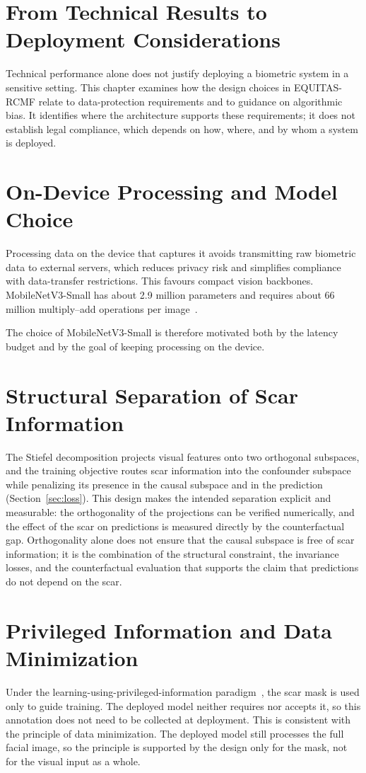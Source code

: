 \section{From Technical Results to Deployment Considerations}
Technical performance alone does not justify deploying a biometric system in a sensitive setting. This chapter examines how the design choices in EQUITAS-RCMF relate to data-protection requirements and to guidance on algorithmic bias. It identifies where the architecture supports these requirements; it does not establish legal compliance, which depends on how, where, and by whom a system is deployed.

\section{On-Device Processing and Model Choice}
Processing data on the device that captures it avoids transmitting raw biometric data to external servers, which reduces privacy risk and simplifies compliance with data-transfer restrictions. This favours compact vision backbones. MobileNetV3-Small has about 2.9 million parameters and requires about 66 million multiply--add operations per image~\cite{howard2019}.

The choice of MobileNetV3-Small is therefore motivated both by the latency budget and by the goal of keeping processing on the device.

\section{Structural Separation of Scar Information}
The Stiefel decomposition projects visual features onto two orthogonal subspaces, and the training objective routes scar information into the confounder subspace while penalizing its presence in the causal subspace and in the prediction (Section~\ref{sec:loss}). This design makes the intended separation explicit and measurable: the orthogonality of the projections can be verified numerically, and the effect of the scar on predictions is measured directly by the counterfactual gap. Orthogonality alone does not ensure that the causal subspace is free of scar information; it is the combination of the structural constraint, the invariance losses, and the counterfactual evaluation that supports the claim that predictions do not depend on the scar.

\section{Privileged Information and Data Minimization}
Under the learning-using-privileged-information paradigm~\cite{vapnik2009, vapnik2015}, the scar mask is used only to guide training. The deployed model neither requires nor accepts it, so this annotation does not need to be collected at deployment. This is consistent with the principle of data minimization. The deployed model still processes the full facial image, so the principle is supported by the design only for the mask, not for the visual input as a whole.

